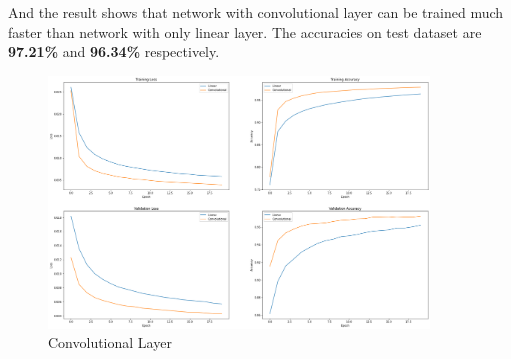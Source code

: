 \documentclass[a4paper, 11pt]{article} %
\begin{document}
And the result shows that network with convolutional layer can be trained much faster than
network with only linear layer. The accuracies on test dataset are \textbf{97.21\%} and
\textbf{96.34\%} respectively.

\begin{figure}[H]
    \centering
    \includegraphics[width=0.9\textwidth]{./img/conv-layer.png}
    \caption{Convolutional Layer}
\end{figure}

\bigskip



\end{document}
